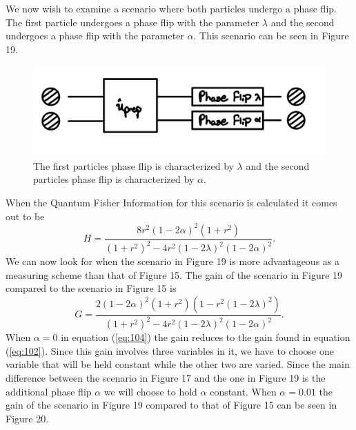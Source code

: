 \documentclass[twocolumn]{article}
\begin{document}
We now wish to examine a scenario where both particles undergo a phase flip. The first particle undergoes a phase flip with the parameter $\lambda$ and the second undergoes a phase flip with the parameter $\alpha$. This scenario can be seen in Figure 19.
\begin{figure}[h]
\begin{center}
\includegraphics[width=0.65\linewidth]{Two-Particle-Phase-Flip-Dual-Channel-Alpha-Lambda-Schematic.jpg}
\caption{The first particles phase flip is characterized by $\lambda$ and the second particles phase flip is characterized by $\alpha$.}
\end{center}
\end{figure}
\newline
When the Quantum Fisher Information for this scenario is calculated it comes out to be
\begin{equation}\label{eq:103}
H=\frac{8r^2(1-2\alpha)^2(1+r^2)}{(1+r^2)^2-4r^2(1-2\lambda)^2(1-2\alpha)^2}.
\end{equation}
We can now look for when the scenario in Figure 19 is more advantageous as a measuring scheme than that of Figure 15. The gain of the scenario in Figure 19 compared to the scenario in Figure 15 is
\begin{equation}\label{eq:104}
G=\frac{2(1-2\alpha)^2(1+r^2)(1-r^2(1-2\lambda)^2)}{(1+r^2)^2-4r^2(1-2\lambda)^2(1-2\alpha)^2}.
\end{equation}
When $\alpha=0$ in equation (\ref{eq:104}) the gain reduces to the gain found in equation (\ref{eq:102}). Since this gain involves three variables in it, we have to choose one variable that will be held constant while the other two are varied. Since the main difference between the scenario in Figure 17 and the one in Figure 19 is the additional phase flip $\alpha$ we will choose to hold $\alpha$ constant. When $\alpha=0.01$ the gain of the scenario in Figure 19 compared to that of Figure 15 can be seen in Figure 20.
\end{document}
